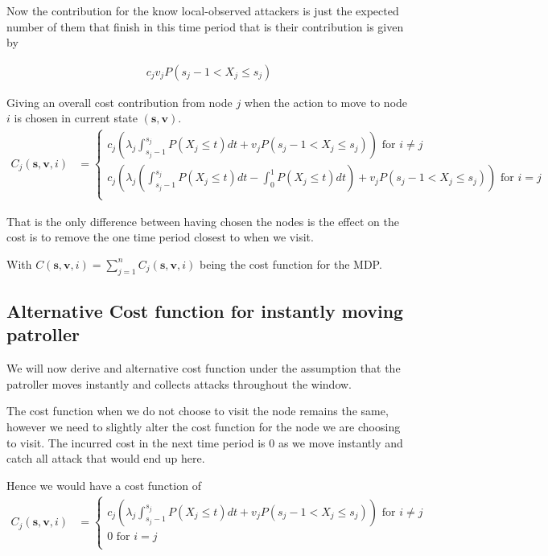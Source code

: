 \documentclass[a4paper,10pt]{article}
\theoremstyle{definition}
\theoremstyle{definition}
\theoremstyle{remark}
\theoremstyle{definition}
\begin{document}
Now the contribution for the know local-observed attackers is just the expected number of them that finish in this time period that is their contribution is given by

\begin{align*}
c_{j} v_{j} P(s_{j}-1 < X_{j} \leq s_{j})
\end{align*}


Giving an overall cost contribution from node $j$ when the action to move to node $i$ is chosen in current state $(\bm{s},\bm{v})$.
\begin{align}
C_{j}(\bm{s},\bm{v},i)&= \begin{cases}
c_{j} (\lambda_{j} \int_{s_{j}-1}^{s_{j}} P(X_{j} \leq t) dt + v_{j} P(s_{j}-1 < X_{j} \leq s_{j})) \text{ for } i \neq j \\
c_{j} (\lambda_{j} (\int_{s_{j}-1}^{s_{j}} P(X_{j} \leq t) dt - \int_{0}^{1} P(X_{j} \leq t) dt)+v_{j} P(s_{j}-1 < X_{j} \leq s_{j}))  \text{ for } i=j \\
\end{cases} 
\end{align}

That is the only difference between having chosen the nodes is the effect on the cost is to remove the one time period closest to when we visit.
   
With $C(\bm{s},\bm{v},i)=\sum\limits_{j=1}^{n} C_{j}(\bm{s},\bm{v},i)$ being the cost function for the MDP.

\subsection{Alternative Cost function for instantly moving patroller}
We will now derive and alternative cost function under the assumption that the patroller moves instantly and collects attacks throughout the window.

The cost function when we do not choose to visit the node remains the same, however we need to slightly alter the cost function for the node we are choosing to visit. The incurred cost in the next time period is $0$ as we move instantly and catch all attack that would end up here.

Hence we would have a cost function of
\begin{align}
C_{j}(\bm{s},\bm{v},i)&= \begin{cases}
c_{j} (\lambda_{j} \int_{s_{j}-1}^{s_{j}} P(X_{j} \leq t) dt + v_{j} P(s_{j}-1 < X_{j} \leq s_{j})) \text{ for } i \neq j \\
0 \text{ for } i=j \\
\end{cases} 
\end{align}
\end{document}
